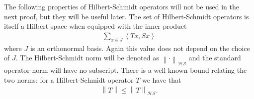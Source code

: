 \documentclass[aos,preprint]{imsart}
\def\l{\left}
\def\r{\right}
\def\hs{\mathscr{HS}}
\theoremstyle{plain}
\theoremstyle{defintion}
\begin{document}
	The following properties of Hilbert-Schmidt operators will not be used in the next proof, but they will be useful later. The set of Hilbert-Schmidt operators is itself a Hilbert space when equipped with the inner product
	\begin{eqnarray*}
		\sum_{x\in J} \l<Tx,Sx\r>
	\end{eqnarray*}
	where $J$ is an orthonormal basis. Again this value does not depend on the choice of $J$. The Hilbert-Schmidt norm will be denoted as $\l\|\cdot \r\|_\hs$ and the standard operator norm will have no subscript. There is a well known bound relating the two norms: for a Hilbert-Schmidt operator $T$ we have that 
	\begin{eqnarray*}
		\l\|T \r\| \le \l\|T \r\|_\hs.
	\end{eqnarray*}
\end{document}
